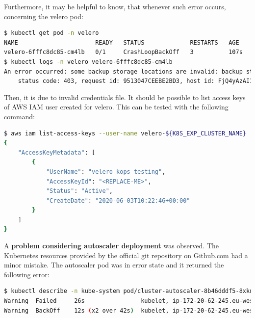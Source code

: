 Furthermore, it may be helpful to know, that whenever such error occurs, concerning the velero pod:
\begin{lstlisting}[basicstyle=\tiny,caption={TODO},captionpos=b,language=Bash,xleftmargin=1cm]
$ kubectl get pod -n velero
NAME                      READY   STATUS             RESTARTS   AGE
velero-6fffc8dc85-cm4lb   0/1     CrashLoopBackOff   3          107s
$ kubectl logs -n velero velero-6fffc8dc85-cm4lb
An error occurred: some backup storage locations are invalid: backup store for location "aws" is invalid: rpc error: code = Unknown desc = AccessDenied: Access Denied
	status code: 403, request id: 9513047CEEBE2BD3, host id: FjQ4yAzAI1zhyFXRIS67Ww3rSqt2a1fqoeLzYEAdKsRLqx3AmpEzWWloJZXZPx9rKJs9qCH1yHY=
\end{lstlisting}
Then, it is due to invalid credentials file. It should be possible to list access keys of AWS IAM user created for velero. This can be tested with the following command:
\begin{lstlisting}[basicstyle=\tiny,caption={TODO},captionpos=b,language=Bash,xleftmargin=1cm]
$ aws iam list-access-keys --user-name velero-${K8S_EXP_CLUSTER_NAME}
{
    "AccessKeyMetadata": [
        {
            "UserName": "velero-kops-testing",
            "AccessKeyId": "<REPLACE-ME>",
            "Status": "Active",
            "CreateDate": "2020-06-03T10:22:46+00:00"
        }
    ]
}
\end{lstlisting}

A \textbf{problem considering autoscaler deployment} was observed. The Kubernetes resources provided by the official git repository on Github.com had a minor mistake. The autoscaler pod was in error state and it returned the following error:
\begin{lstlisting}[basicstyle=\tiny,caption={TODO},captionpos=b,language=Bash,xleftmargin=1cm]
$ kubectl describe -n kube-system pod/cluster-autoscaler-8b46dddf5-8xkns
Warning  Failed     26s                kubelet, ip-172-20-62-245.eu-west-1.compute.internal  Error: failed to start container "cluster-autoscaler": Error response from daemon: OCI runtime create failed: container_linux.go:346: starting container process caused "process_linux.go:449: container init caused \"rootfs_linux.go:58: mounting \\\"/etc/ssl/certs/ca-bundle.crt\\\" to rootfs \\\"/var/lib/docker/overlay2/0f99e6ea6c9a9f8dedf87b977b72ecff7b56e0e6e439fcd8f9275bda3dbcabe6/merged\\\" at \\\"/var/lib/docker/overlay2/0f99e6ea6c9a9f8dedf87b977b72ecff7b56e0e6e439fcd8f9275bda3dbcabe6/merged/etc/ssl/certs/ca-certificates.crt\\\" caused \\\"not a directory\\\"\"": unknown: Are you trying to mount a directory onto a file (or vice-versa)? Check if the specified host path exists and is the expected type
Warning  BackOff    12s (x2 over 42s)  kubelet, ip-172-20-62-245.eu-west-1.compute.internal  Back-off restarting failed container
\end{lstlisting}

